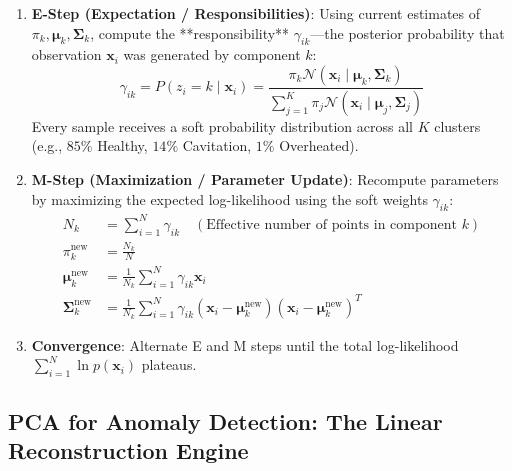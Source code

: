 \begin{enumerate}
    \item \textbf{E-Step (Expectation / Responsibilities)}:
    Using current estimates of $\pi_k, \boldsymbol{\mu}_k, \mathbf{\Sigma}_k$, compute the **responsibility** $\gamma_{ik}$---the posterior probability that observation $\mathbf{x}_i$ was generated by component $k$:
    \begin{equation}
    \gamma_{ik} = P(z_i = k \mid \mathbf{x}_i) = \frac{\pi_k \mathcal{N}(\mathbf{x}_i \mid \boldsymbol{\mu}_k, \mathbf{\Sigma}_k)}{\sum_{j=1}^{K} \pi_j \mathcal{N}(\mathbf{x}_i \mid \boldsymbol{\mu}_j, \mathbf{\Sigma}_j)}\label{eq:gmm_responsibility}
    \end{equation}
    Every sample receives a soft probability distribution across all $K$ clusters (e.g., $85\%$ Healthy, $14\%$ Cavitation, $1\%$ Overheated).

    \item \textbf{M-Step (Maximization / Parameter Update)}:
    Recompute parameters by maximizing the expected log-likelihood using the soft weights $\gamma_{ik}$:
    \begin{align}
    N_k &= \sum_{i=1}^{N} \gamma_{ik} \quad (\text{Effective number of points in component } k) \\
    \pi_k^{\text{new}} &= \frac{N_k}{N}\label{eq:gmm_update_pi} \\
    \boldsymbol{\mu}_k^{\text{new}} &= \frac{1}{N_k} \sum_{i=1}^{N} \gamma_{ik} \mathbf{x}_i\label{eq:gmm_update_mu} \\
    \mathbf{\Sigma}_k^{\text{new}} &= \frac{1}{N_k} \sum_{i=1}^{N} \gamma_{ik} (\mathbf{x}_i - \boldsymbol{\mu}_k^{\text{new}}) (\mathbf{x}_i - \boldsymbol{\mu}_k^{\text{new}})^T\label{eq:gmm_update_sigma}
    \end{align}
    \item \textbf{Convergence}: Alternate E and M steps until the total log-likelihood $\sum_{i=1}^N \ln p(\mathbf{x}_i)$ plateaus.
\end{enumerate}

\subsection{PCA for Anomaly Detection: The Linear Reconstruction Engine}\label{subsec:pca_anomaly}


